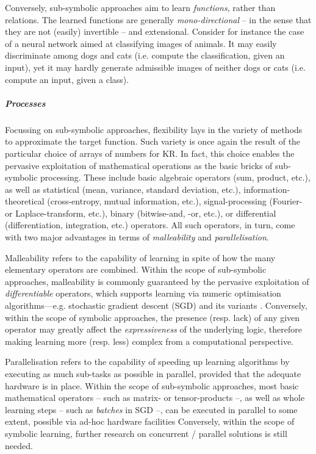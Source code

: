 \documentclass[12pt,a4paper,openright,twoside]{book}
\begin{document}
Conversely, sub-symbolic approaches aim to learn \emph{functions}, rather than relations.
%
The learned functions are generally \emph{mono-directional} -- in the sense that they are not (easily) invertible -- and extensional.
%
Consider for instance the case of a neural network aimed at classifying images of animals.
%
It may easily discriminate among dogs and cats (i.e. compute the classification, given an input), yet it may hardly generate admissible images of neither dogs or cats (i.e. compute an input, given a class)\footnotemark.


\subparagraph{Processes}

Focussing on sub-symbolic approaches, flexibility lays in the variety of methods to approximate the target function.
%
Such variety is once again the result of the particular choice of arrays of numbers for KR.
%
In fact, this choice enables the pervasive exploitation of mathematical operations as the basic bricks of sub-symbolic processing. %
%
These include basic algebraic operators (sum, product, etc.), as well as statistical (mean, variance, standard deviation, etc.), information-theoretical (cross-entropy, mutual information, etc.), signal-processing (Fourier- or Laplace-transform, etc.), binary (bitwise-and, -or, etc.), or differential (differentiation, integration, etc.) operators.
%
All such operators, in turn, come with two major advantages in terms of \emph{malleability} and \emph{parallelisation}.

Malleability refers to the capability of learning in spite of how the many elementary operators are combined.
%
Within the scope of sub-symbolic approaches, malleability is commonly guaranteed by the pervasive exploitation of \emph{differentiable} operators, which supports learning via numeric optimisation algorithms---e.g. stochastic gradient descent (SGD) and its variants \cite{enwiki:SGD}.
%
Conversely, within the scope of symbolic approaches, the presence (resp. lack) of any given operator may greatly affect the \emph{expressiveness} of the underlying logic, therefore making learning more (resp. less) complex from a computational perspective.

Parallelisation refers to the capability of speeding up learning algorithms by executing as much sub-tasks as possible in parallel, provided that the adequate hardware is in place.
%
Within the scope of sub-symbolic approaches, most basic mathematical operators -- such as matrix- or tensor-products --, as well as whole learning steps -- such as \emph{batches} in SGD --, can be executed in parallel to some extent, possible via ad-hoc hardware facilities
%
Conversely, within the scope of symbolic learning, further research on concurrent / parallel solutions is still needed.
\end{document}
